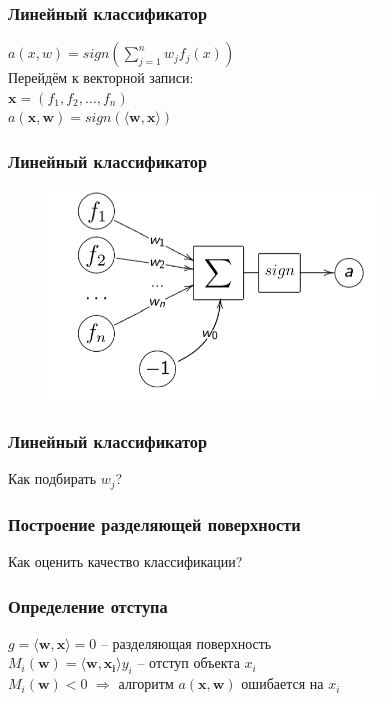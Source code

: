 \documentclass[12pt]{beamer}
\begin{document}
\begin{frame}\frametitle{Линейный классификатор}
$a(x, w) = sign(\sum\limits_{j=1}^n w_jf_j(x))$\\

\vspace{3mm}
Перейдём к векторной записи:\\
$\mathbf{x} = (f_1, f_2, \dots, f_n)$\\
\vspace{3mm}
$a(\mathbf{x}, \mathbf{w}) = sign(\langle \mathbf{w}, \mathbf{x}\rangle)$\\
\end{frame}


\begin{frame}\frametitle{Линейный классификатор}
\begin{figure}[htbp]
  \includegraphics[height=160pt, keepaspectratio = true]{images/neuron}   
\end{figure}
\end{frame}

\begin{frame}\frametitle{Линейный классификатор}
Как подбирать $w_j$?
\end{frame}

\begin{frame}\frametitle{Построение разделяющей поверхности}
Как оценить качество классификации?
\end{frame}

\begin{frame}\frametitle{Определение отступа}
${g = \langle \mathbf{w}, \mathbf{x}\rangle = 0}$ -- разделяющая поверхность\\
$M_i(\mathbf{w}) = \langle \mathbf{w}, \mathbf{x_i}\rangle y_i$ -- отступ объекта $x_i$\\
${M_i(\mathbf{w})<0}$ $\Rightarrow$ алгоритм $a(\mathbf{x},\mathbf{w})$ ошибается на $x_i$
\end{frame}
\end{document}
